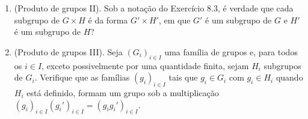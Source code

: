 \begin{enumerate}[label=9.\arabic*.]
    \item (Produto de grupos II). Sob a notação do Exercício 8.3, é verdade que cada subgrupo de $G \times H$ é 
    da forma $G' \times H'$, em que $G'$ é um subgrupo de $G$ e $H'$ é um subgrupo de $H$? 

    \item (Produto de grupos III). Seja $(G_i)_{i \in I}$ uma família de grupos e, para todos os $i \in I$, 
    exceto possivelmente por uma quantidade finita, sejam $H_i$ subgrupos de $G_i$. Verifique que as famílias 
    $(g_i)_{i \in I}$ tais que $g_i \in G_i$ com $g_i \in H_i$ quando $H_i$ está definido, formam um grupo sob 
    a multiplicação $(g_i)_{i \in I} (g_i')_{i \in I} = (g_ig_i')_{i \in I}$. 

\end{enumerate}
